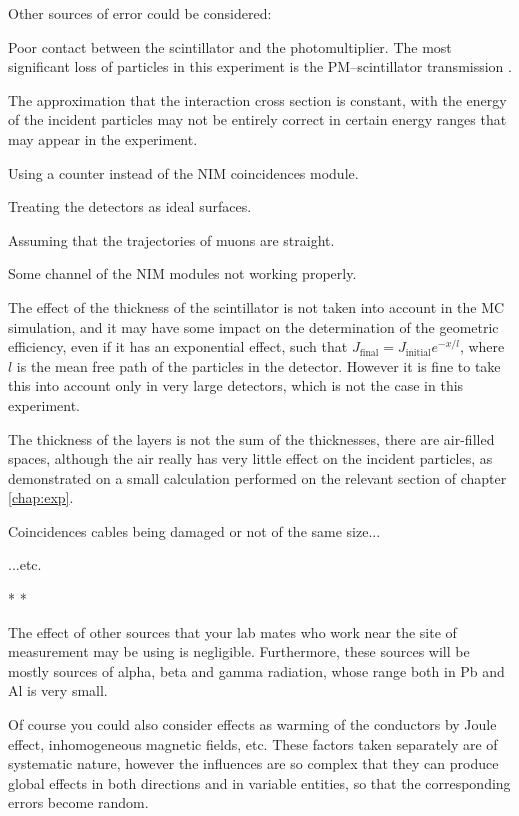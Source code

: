 Other sources of error could be considered:
	\bi
		\item Poor contact between the scintillator and the photomultiplier. The most significant loss of particles in this experiment is the PM--scintillator transmission \cite{sou:83}.
		\item The approximation that the interaction cross section is constant, with the energy of the incident particles may not be entirely correct in certain energy ranges that may appear in the experiment.
		\item Using a counter instead of the NIM coincidences module.
		\item Treating the detectors as ideal surfaces.
		\item Assuming that the trajectories of muons are straight.
		\item Some channel of the NIM modules not working properly.
		\item The effect of the thickness of the scintillator is not taken into account in the MC simulation, and it may have some impact on the determination of the geometric efficiency, even if it has an exponential effect, such that $J_\text{final} = J_\text{initial} e^{- x / l}$, where $l$ is the mean free path of the particles in the detector. However it is fine to take this into account only in very large detectors, which is not the case in this experiment.
		\item The thickness of the layers is not the sum of the thicknesses, there are air-filled spaces, although the air really has very little effect on the incident particles, as demonstrated on a small calculation performed on the relevant section of chapter \ref{chap:exp}.
		\item Coincidences cables being damaged or not of the same size...
		\item ...etc.
	\ei


	\bc* * *\ec

The effect of other sources that your lab mates who work near the site of measurement may be using is negligible. Furthermore, these sources will be mostly sources of alpha, beta and gamma radiation, whose range both in Pb and Al is very small.

Of course you could also consider effects as warming of the conductors by Joule effect, inhomogeneous magnetic fields, etc. These factors taken separately are of systematic nature, however the influences are so complex that they can produce global effects in both directions and in variable entities, so that the corresponding errors become random.


